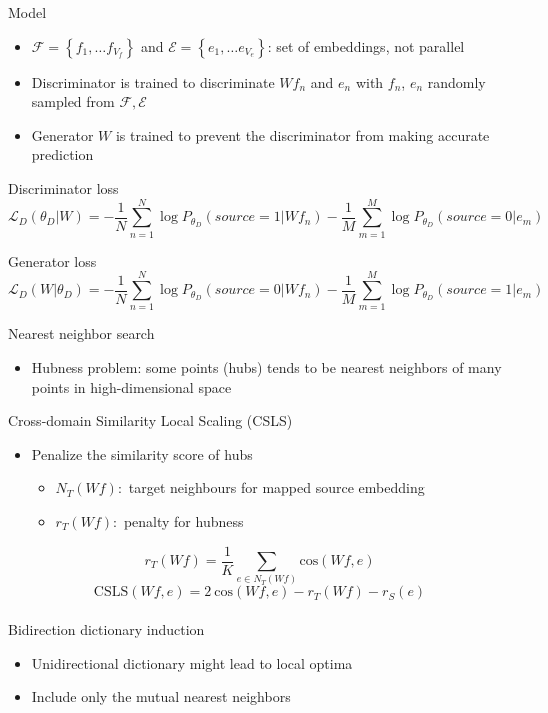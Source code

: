 \documentclass[11pt, a4paper, landscape]{article}
\begin{document}
	
	\NewPage
	\vfill
	Model
	\begin{itemize}
		\item  ${\mathcal{F} = \left\{ f_1, \ldots f_{V_f} \right\} }$ and  ${\mathcal{E} = \left\{ e_1, \ldots e_{V_e} \right\} }$: set of embeddings, not parallel
		\item Discriminator is trained to discriminate ${W{f_n}}$ and ${e_n}$ with ${f_n}$, ${e_n}$ randomly sampled from ${ \mathcal{F},  \mathcal{E} }$ 
		\item Generator ${W}$ is trained to prevent the discriminator from making accurate prediction
		
	\end{itemize}
	
	
	
	Discriminator loss
	\[ \mathcal{L}_D(\theta_D|W) = -\frac{1}{N}\sum_{n=1}^{N}\log P_{\theta_D}(source=1| W f_n) - \frac{1}{M}\sum_{m=1}^{M}\log P_{\theta_D}(source=0| e_m)\]
	
	
	Generator  loss 
	\[ \mathcal{L}_D(W|\theta_D) = -\frac{1}{N}\sum_{n=1}^{N}\log P_{\theta_D}(source=0| W f_n) - \frac{1}{M}\sum_{m=1}^{M}\log P_{\theta_D}(source=1| e_m)\]
	



	\NewPage
	\vfill
	Nearest neighbor search
	\begin{itemize}
		\item Hubness problem: some points (hubs) tends to be nearest neighbors of many points in high-dimensional space\\
	\end{itemize}
	Cross-domain Similarity Local Scaling (CSLS)
	\begin{itemize}

		\item Penalize the similarity score of hubs
			\begin{itemize}
				\item $N_T(Wf):$ target neighbours for mapped source embedding
				\item $r_T(W f):$ penalty for hubness
			\end{itemize}
	\end{itemize}
	\[r_T(W f) = \frac{1}{K} \sum_{e \in N_T(Wf)}\textrm{cos}(Wf, e) \]
	\[ \textrm{CSLS}(Wf, e) = 2\ \textrm{cos}(Wf, e)-r_{T}(Wf)-r_{S}(e)\]\\
	Bidirection dictionary induction
	\begin{itemize}
		\item Unidirectional dictionary might lead to local optima
		\item Include only the mutual nearest neighbors 
	\end{itemize}
	\vfill
	
\end{document}
